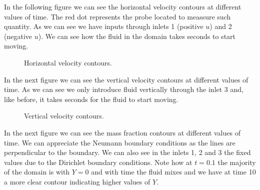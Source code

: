 In the following figure we can see the horizontal velocity contours at different values of time. The red dot represents the probe located to meassure such quantity. As we can see we have inputs through inlets 1 (positive $u$) and 2 (negative $u$). We can see how the fluid in the domain takes seconds to start moving.

\begin{figure}[H]
\centering     %
\hspace*{\fill}
\hfill
{}
\hspace*{\fill}

\hspace*{\fill}
\hfill
{}
\hspace*{\fill}
\caption{Horizontal velocity contours.}
\end{figure}

In the next figure we can see the vertical velocity contours at different values of time. As we can see we only introduce fluid vertically through the inlet 3 and, like before, it takes seconds for the fluid to start moving.

\begin{figure}[H]
\centering     %
\hspace*{\fill}
\hfill
{}
\hspace*{\fill}

\hspace*{\fill}
\hfill
{}
\hspace*{\fill}
\caption{Vertical velocity contours.}
\end{figure}

In the next figure we can see the mass fraction contours at different values of
time. We can appreciate the Neumann boundary conditions as the lines are perpendicular to the boundary. We can also see in the inlets 1, 2 and 3 the fixed values due to the Dirichlet boundary conditions. Note how at $t=0.1$ the majority of the domain is with $Y=0$ and with time the fluid mixes and we have at time 10 a more clear contour indicating higher values of $Y$.

